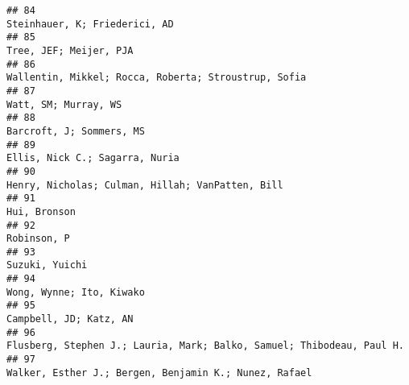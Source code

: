 \documentclass[
  english,
  man]{apa6}
\begin{document}
\begin{verbatim}
## 84                                                                                                                                                             Steinhauer, K; Friederici, AD
## 85                                                                                                                                                                    Tree, JEF; Meijer, PJA
## 86                                                                                                                                      Wallentin, Mikkel; Rocca, Roberta; Stroustrup, Sofia
## 87                                                                                                                                                                      Watt, SM; Murray, WS
## 88                                                                                                                                                                  Barcroft, J; Sommers, MS
## 89                                                                                                                                                            Ellis, Nick C.; Sagarra, Nuria
## 90                                                                                                                                          Henry, Nicholas; Culman, Hillah; VanPatten, Bill
## 91                                                                                                                                                                              Hui, Bronson
## 92                                                                                                                                                                               Robinson, P
## 93                                                                                                                                                                            Suzuki, Yuichi
## 94                                                                                                                                                                  Wong, Wynne; Ito, Kiwako
## 95                                                                                                                                                                    Campbell, JD; Katz, AN
## 96                                                                                                                     Flusberg, Stephen J.; Lauria, Mark; Balko, Samuel; Thibodeau, Paul H.
## 97                                                                                                                                     Walker, Esther J.; Bergen, Benjamin K.; Nunez, Rafael

\end{verbatim}
\end{document}
